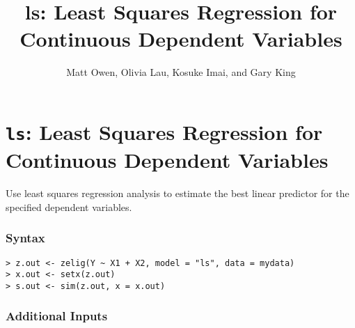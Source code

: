 \documentclass{article}
\title{
  ls: Least Squares Regression for Continuous
  Dependent Variables
}
\author{Matt Owen, Olivia Lau, Kosuke Imai, and Gary King}
\begin{document}
\nobibliography*



\section{{\tt ls}: Least Squares Regression for Continuous
Dependent Variables}
\label{ls}

Use least squares regression analysis to estimate the best linear
predictor for the specified dependent variables.

\subsubsection{Syntax}

\begin{verbatim}
> z.out <- zelig(Y ~ X1 + X2, model = "ls", data = mydata)
> x.out <- setx(z.out)
> s.out <- sim(z.out, x = x.out)
\end{verbatim}

\subsubsection{Additional Inputs}  
\end{document}
